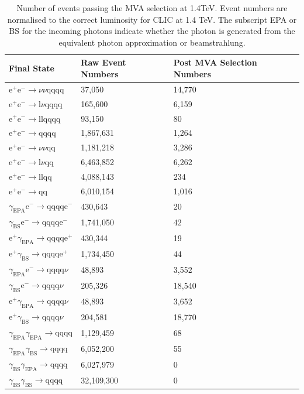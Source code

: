 \begin{table}[h!]
\centering
\begin{tabular}{ l l l}
\hline
Final State & Raw Event Numbers & Post MVA Selection Numbers \\ 
\hline
$\text{e}^{+}\text{e}^{-} \rightarrow \nu{\nu}\text{qqqq}$ & 37,050 & 14,770 \\
$\text{e}^{+}\text{e}^{-} \rightarrow \text{l}\nu\text{qqqq}$ & 165,600 & 6,159 \\
$\text{e}^{+}\text{e}^{-} \rightarrow \text{llqqqq}$ & 93,150 & 80 \\
$\text{e}^{+}\text{e}^{-} \rightarrow \text{qqqq}$ & 1,867,631 & 1,264 \\
$\text{e}^{+}\text{e}^{-} \rightarrow \nu{\nu}\text{qq}$ & 1,181,218 & 3,286 \\
$\text{e}^{+}\text{e}^{-} \rightarrow \text{l}\nu\text{qq}$ & 6,463,852 & 6,262 \\
$\text{e}^{+}\text{e}^{-} \rightarrow \text{llqq}$ & 4,088,143 & 234 \\
$\text{e}^{+}\text{e}^{-} \rightarrow \text{qq}$ & 6,010,154 & 1,016 \\
$\gamma_{\text{EPA}}\text{e}^{-} \rightarrow \text{qqqq}\text{e}^{-}$ & 430,643 & 20 \\
$\gamma_{\text{BS}}\text{e}^{-} \rightarrow \text{qqqq}\text{e}^{-}$ & 1,741,050 & 42 \\
$\text{e}^{+}\gamma_{\text{EPA}} \rightarrow \text{qqqq}\text{e}^{+}$ & 430,344 & 19 \\
$\text{e}^{+}\gamma_{\text{BS}} \rightarrow \text{qqqq}\text{e}^{+}$ & 1,734,450 & 44 \\
$\gamma_{\text{EPA}}\text{e}^{-} \rightarrow \text{qqqq}\nu$ & 48,893 & 3,552 \\
$\gamma_{\text{BS}}\text{e}^{-} \rightarrow \text{qqqq}\nu$ & 205,326 & 18,540 \\
$\text{e}^{+}\gamma_{\text{EPA}} \rightarrow \text{qqqq}\nu$ & 48,893 & 3,652 \\
$\text{e}^{+}\gamma_{\text{BS}} \rightarrow \text{qqqq}\nu$ & 204,581 & 18,770 \\
$\gamma_{\text{EPA}}\gamma_{\text{EPA}} \rightarrow \text{qqqq}$ & 1,129,459 & 68 \\
$\gamma_{\text{EPA}}\gamma_{\text{BS}} \rightarrow \text{qqqq}$ & 6,052,200 & 55 \\
$\gamma_{\text{BS}}\gamma_{\text{EPA}} \rightarrow \text{qqqq}$ & 6,027,979 & 0 \\
$\gamma_{\text{BS}}\gamma_{\text{BS}} \rightarrow \text{qqqq}$ & 32,109,300 & 0 \\
\hline
\end{tabular}
\caption[Number of events passing the MVA selection at 1.4TeV.]{Number of events passing the MVA selection at 1.4TeV.  Event numbers are normalised to the correct luminosity for CLIC at 1.4 TeV.   The subscript EPA or BS for the incoming photons indicate whether the photon is generated from the equivalent photon approximation or beamstrahlung.}
\label{table:postmvanumbers1400GeV}
\end{table}

